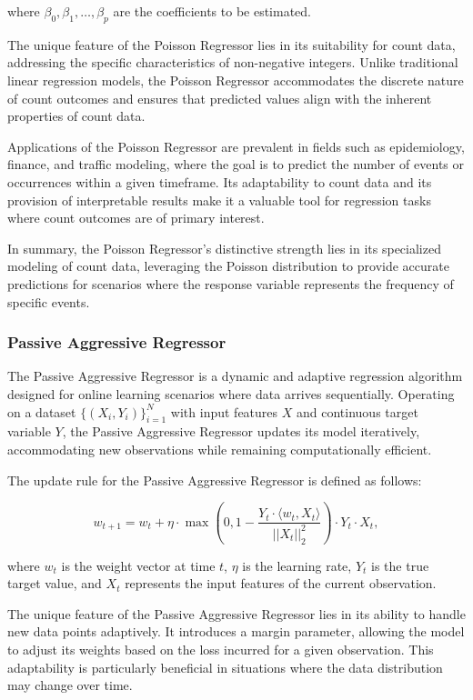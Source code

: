 \documentclass[twocolumn]{article}
\begin{document}
where \(\beta_0, \beta_1, \ldots, \beta_p\) are the coefficients to be estimated.

The unique feature of the Poisson Regressor lies in its suitability for count data, addressing the specific characteristics of non-negative integers. Unlike traditional linear regression models, the Poisson Regressor accommodates the discrete nature of count outcomes and ensures that predicted values align with the inherent properties of count data.

Applications of the Poisson Regressor are prevalent in fields such as epidemiology, finance, and traffic modeling, where the goal is to predict the number of events or occurrences within a given timeframe. Its adaptability to count data and its provision of interpretable results make it a valuable tool for regression tasks where count outcomes are of primary interest.

In summary, the Poisson Regressor's distinctive strength lies in its specialized modeling of count data, leveraging the Poisson distribution to provide accurate predictions for scenarios where the response variable represents the frequency of specific events.

		\subsubsection{Passive Aggressive Regressor}
The Passive Aggressive Regressor is a dynamic and adaptive regression algorithm designed for online learning scenarios where data arrives sequentially. Operating on a dataset \(\{(X_i, Y_i)\}_{i=1}^{N}\) with input features \(X\) and continuous target variable \(Y\), the Passive Aggressive Regressor updates its model iteratively, accommodating new observations while remaining computationally efficient.

The update rule for the Passive Aggressive Regressor is defined as follows:

\[ w_{t+1} = w_t + \eta \cdot \max(0, 1 - \frac{Y_t \cdot \langle w_t, X_t \rangle}{||X_t||_2^2}) \cdot Y_t \cdot X_t, \]

where \(w_t\) is the weight vector at time \(t\), \(\eta\) is the learning rate, \(Y_t\) is the true target value, and \(X_t\) represents the input features of the current observation.

The unique feature of the Passive Aggressive Regressor lies in its ability to handle new data points adaptively. It introduces a margin parameter, allowing the model to adjust its weights based on the loss incurred for a given observation. This adaptability is particularly beneficial in situations where the data distribution may change over time.
\end{document}
